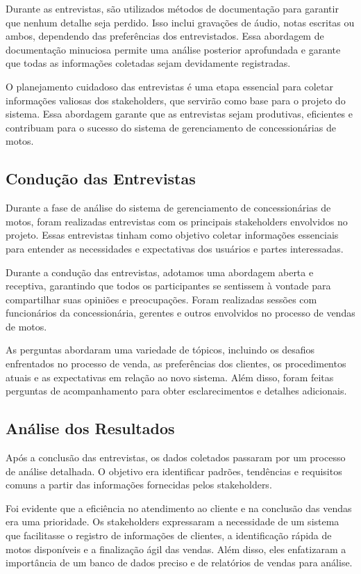 Durante as entrevistas, são utilizados métodos de documentação para garantir que nenhum detalhe seja perdido. Isso inclui gravações de áudio, notas escritas ou ambos, dependendo das preferências dos entrevistados. Essa abordagem de documentação minuciosa permite uma análise posterior aprofundada e garante que todas as informações coletadas sejam devidamente registradas.

O planejamento cuidadoso das entrevistas é uma etapa essencial para coletar informações valiosas dos stakeholders, que servirão como base para o projeto do sistema. Essa abordagem garante que as entrevistas sejam produtivas, eficientes e contribuam para o sucesso do sistema de gerenciamento de concessionárias de motos.

\subsection{Condução das Entrevistas}

Durante a fase de análise do sistema de gerenciamento de concessionárias de motos, foram realizadas entrevistas com os principais stakeholders envolvidos no projeto. Essas entrevistas tinham como objetivo coletar informações essenciais para entender as necessidades e expectativas dos usuários e partes interessadas.

Durante a condução das entrevistas, adotamos uma abordagem aberta e receptiva, garantindo que todos os participantes se sentissem à vontade para compartilhar suas opiniões e preocupações. Foram realizadas sessões com funcionários da concessionária, gerentes e outros envolvidos no processo de vendas de motos.

As perguntas abordaram uma variedade de tópicos, incluindo os desafios enfrentados no processo de venda, as preferências dos clientes, os procedimentos atuais e as expectativas em relação ao novo sistema. Além disso, foram feitas perguntas de acompanhamento para obter esclarecimentos e detalhes adicionais.

\subsection{Análise dos Resultados}

Após a conclusão das entrevistas, os dados coletados passaram por um processo de análise detalhada. O objetivo era identificar padrões, tendências e requisitos comuns a partir das informações fornecidas pelos stakeholders.

Foi evidente que a eficiência no atendimento ao cliente e na conclusão das vendas era uma prioridade. Os stakeholders expressaram a necessidade de um sistema que facilitasse o registro de informações de clientes, a identificação rápida de motos disponíveis e a finalização ágil das vendas. Além disso, eles enfatizaram a importância de um banco de dados preciso e de relatórios de vendas para análise.

